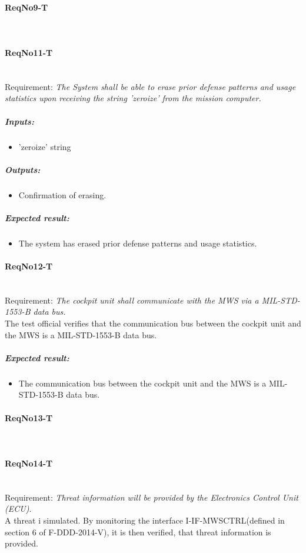 \paragraph{ReqNo9-T}\mbox{}\\ %


\paragraph{ReqNo11-T}\mbox{}\\ %
Requirement: \textit{The System shall be able to erase prior defense patterns and usage statistics upon receiving the string 'zeroize' from the mission computer.}\\
	\subparagraph{Inputs:}
	\begin{itemize}
	\item 'zeroize' string
	\end{itemize}
	\subparagraph{Outputs:}
	\begin{itemize}
	\item Confirmation of erasing.
	\end{itemize}
	\subparagraph{Expected result:}
	\begin{itemize}
	\item The system has erased prior defense patterns and usage statistics.
	\end{itemize}

\paragraph{ReqNo12-T}\mbox{}\\ %
Requirement: \textit{The cockpit unit shall communicate with the MWS via a MIL-STD-1553-B data bus.}\\
The test official verifies that the communication bus between the cockpit unit and the MWS is a MIL-STD-1553-B data bus.

\subparagraph{Expected result:}
	\begin{itemize}
	\item The communication bus between the cockpit unit and the MWS is a MIL-STD-1553-B data bus.
	\end{itemize}

\paragraph{ReqNo13-T}\mbox{}\\ %

\paragraph{ReqNo14-T}\mbox{}\\ %
Requirement: \textit{Threat information will be provided by the Electronics Control Unit (ECU).}\\
A threat i simulated. By monitoring the interface I-IF-MWSCTRL(defined in section 6 of F-DDD-2014-V), it is then verified, that threat information is provided.

